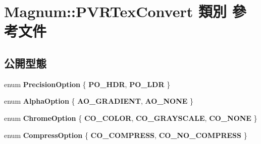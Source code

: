 \hypertarget{class_magnum_1_1_p_v_r_tex_convert}{}\section{Magnum\+:\+:P\+V\+R\+Tex\+Convert 類別 參考文件}
\label{class_magnum_1_1_p_v_r_tex_convert}
\subsection*{公開型態}
\begin{DoxyCompactItemize}
\item 
enum {\bfseries Precision\+Option} \{ {\bfseries P\+O\+\_\+\+H\+DR}, 
{\bfseries P\+O\+\_\+\+L\+DR}
 \}\hypertarget{class_magnum_1_1_p_v_r_tex_convert_a9b34bcce64e913e664fb939d899730cc}{}\label{class_magnum_1_1_p_v_r_tex_convert_a9b34bcce64e913e664fb939d899730cc}

\item 
enum {\bfseries Alpha\+Option} \{ {\bfseries A\+O\+\_\+\+G\+R\+A\+D\+I\+E\+NT}, 
{\bfseries A\+O\+\_\+\+N\+O\+NE}
 \}\hypertarget{class_magnum_1_1_p_v_r_tex_convert_a9859a980f5ee49b26961511c46698239}{}\label{class_magnum_1_1_p_v_r_tex_convert_a9859a980f5ee49b26961511c46698239}

\item 
enum {\bfseries Chrome\+Option} \{ {\bfseries C\+O\+\_\+\+C\+O\+L\+OR}, 
{\bfseries C\+O\+\_\+\+G\+R\+A\+Y\+S\+C\+A\+LE}, 
{\bfseries C\+O\+\_\+\+N\+O\+NE}
 \}\hypertarget{class_magnum_1_1_p_v_r_tex_convert_a81ec8dbd2769b093cad69f77d819f0b5}{}\label{class_magnum_1_1_p_v_r_tex_convert_a81ec8dbd2769b093cad69f77d819f0b5}

\item 
enum {\bfseries Compress\+Option} \{ {\bfseries C\+O\+\_\+\+C\+O\+M\+P\+R\+E\+SS}, 
{\bfseries C\+O\+\_\+\+N\+O\+\_\+\+C\+O\+M\+P\+R\+E\+SS}
 \}\hypertarget{class_magnum_1_1_p_v_r_tex_convert_abcf7ba1eab5fc7e0ade9f3b64f085d71}{}\label{class_magnum_1_1_p_v_r_tex_convert_abcf7ba1eab5fc7e0ade9f3b64f085d71}

\end{DoxyCompactItemize}
